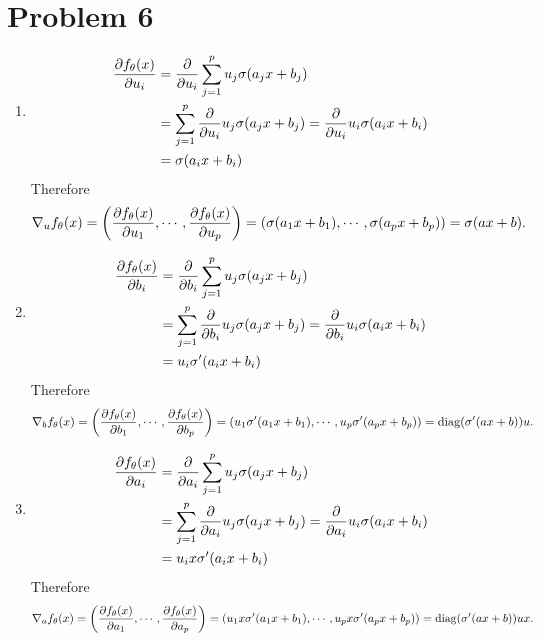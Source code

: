 \documentclass[10pt]{article}
\begin{document}
\section*{Problem 6}
\begin{enumerate}[leftmargin=*, label={(\alph*)}]
\item \begin{align*}
    \frac{\partial f_\theta(x)}{\partial u_i} &= \frac{\partial}{\partial u_i}\sum_{j=1}^{p}u_j\sigma\qty(a_j x + b_j) \\
    &= \sum_{j=1}^{p}\frac{\partial}{\partial u_i}u_j\sigma\qty(a_j x + b_j) = \frac{\partial}{\partial u_i}u_i\sigma\qty(a_i x + b_i) \\
    &= \sigma\qty(a_i x + b_i)
\end{align*}
Therefore
$$\nabla_{u}f_\theta(x) = \qty(\frac{\partial f_\theta(x)}{\partial u_1}, \cdots , \frac{\partial f_\theta(x)}{\partial u_p}) = \qty(\sigma\qty(a_1 x + b_1), \cdots, \sigma\qty(a_p x + b_p)) = \sigma(ax+b).$$
\item \begin{align*}
    \frac{\partial f_\theta(x)}{\partial b_i} &= \frac{\partial}{\partial b_i}\sum_{j=1}^{p}u_j\sigma\qty(a_j x + b_j) \\
    &= \sum_{j=1}^{p}\frac{\partial}{\partial b_i}u_j\sigma\qty(a_j x + b_j) = \frac{\partial}{\partial b_i}u_i\sigma\qty(a_i x + b_i) \\
    &= u_i\sigma'\qty(a_i x + b_i)
\end{align*}
Therefore
$$\nabla_{b}f_\theta(x) = \qty(\frac{\partial f_\theta(x)}{\partial b_1}, \cdots , \frac{\partial f_\theta(x)}{\partial b_p}) = \qty(u_1\sigma'\qty(a_1 x + b_1), \cdots, u_p\sigma'\qty(a_p x + b_p)) = \mathrm{diag}\qty(\sigma'(ax+b))u.$$
\item \begin{align*}
    \frac{\partial f_\theta(x)}{\partial a_i} &= \frac{\partial}{\partial a_i}\sum_{j=1}^{p}u_j\sigma\qty(a_j x + b_j) \\
    &= \sum_{j=1}^{p}\frac{\partial}{\partial a_i}u_j\sigma\qty(a_j x + b_j) = \frac{\partial}{\partial a_i}u_i\sigma\qty(a_i x + b_i) \\
    &= u_ix\sigma'\qty(a_i x + b_i)
\end{align*}
Therefore
$$\nabla_{a}f_\theta(x) = \qty(\frac{\partial f_\theta(x)}{\partial a_1}, \cdots , \frac{\partial f_\theta(x)}{\partial a_p}) = \qty(u_1x\sigma'\qty(a_1 x + b_1), \cdots, u_px\sigma'\qty(a_p x + b_p)) = \mathrm{diag}\qty(\sigma'(ax+b))ux.$$
\end{enumerate}
\end{document}
